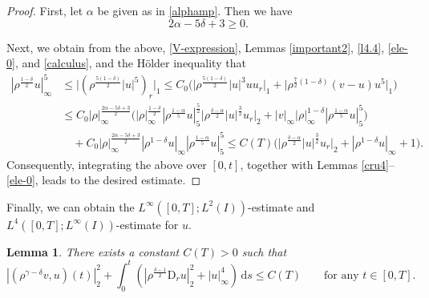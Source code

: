\documentclass[11pt,reqno]{amsart}
\newtheorem{lem}{Lemma}[section]
\numberwithin{rk}{section}
\numberwithin{prop}{section}
\numberwithin{mydef}{section}
\numberwithin{lem}{section}
\numberwithin{equation}{section}
\numberwithin{thm}{section}
\begin{document}
\begin{proof}
First, let $\alpha$ be given as in \eqref{alphamp}. Then we have
\begin{equation*}
2\alpha-5\delta+3\geq 0.
\end{equation*}



Next, we obtain from the above, \eqref{V-expression}, Lemmas \ref{important2}, \ref{l4.4}, \ref{ele-0}, and \ref{calculus}, and the H\"older inequality that
\begin{equation*}
\begin{aligned}
|\rho^\frac{1-\delta}{2}u|_\infty^{5}&\leq \big|(\rho^\frac{5(1-\delta)}{2} |u|^{5})_r\big|_1\leq C_0\big(\big|\rho^\frac{5(1-\delta)}{2}|u|^{3}uu_r\big|_1+\big|\rho^{\frac{7}{2}(1-\delta)} (v-u)u^{5}\big|_1\big)\\
&\leq C_0|\rho|_\infty^{\frac{2\alpha-5\delta+3}{2}}\big(|\rho|_\infty^\frac{1-\delta}{2}|\rho^\frac{1-\alpha}{5}u|_{5}^\frac{5}{2}\big|\rho^\frac{\delta-\alpha}{2}|u|^\frac{3}{2}u_r\big|_2+|v|_\infty |\rho|_\infty^{1-\delta}|\rho^\frac{1-\alpha}{5}u|_{5}^{5}\big)\\
&\quad +C_0|\rho|_\infty^\frac{2\alpha-5\delta+3}{2} |\rho^{1-\delta} u|_\infty|\rho^{\frac{1-\alpha}{5}}u|_{5}^{5}\leq C(T)\big(\big|\rho^\frac{\delta-\alpha}{2}|u|^\frac{3}{2}u_r\big|_2+|\rho^{1-\delta} u|_\infty+1\big).
\end{aligned}
\end{equation*}
Consequently, integrating the above over $[0,t]$, together with Lemmas \ref{cru4}--\ref{ele-0}, leads to the desired estimate.
\end{proof}

Finally, we can obtain the $L^\infty([0,T];L^2(I))$-estimate and $L^4([0,T];L^\infty(I))$-estimate for $u$.
\begin{lem}\label{ele}
There  exists  a constant $C(T)>0$ such that 
\begin{equation*}
|(\rho^{\gamma-\delta} v,u)(t)|_2^2 +\int_0^t ( |\rho^\frac{\delta-1}{2}\mathrm{D}_r u|_2^2+|u|_\infty^4 )\,\mathrm{d}s\leq C(T) \qquad\text{for any $t\in [0,T]$}.
\end{equation*}
\end{lem}
\end{document}

